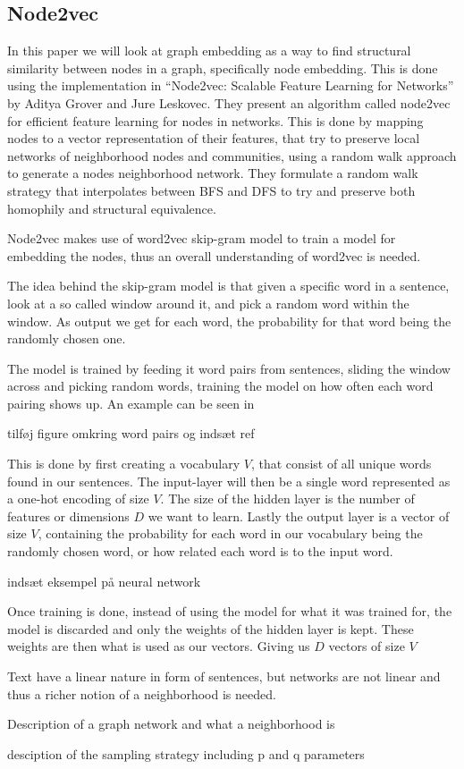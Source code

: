 \subsection{Node2vec}
In this paper we will look at graph embedding as a way to find structural similarity between nodes in a graph, specifically node embedding. This is done using the implementation in “Node2vec: Scalable Feature Learning for Networks” by Aditya Grover and Jure Leskovec. They present an algorithm called node2vec for efficient feature learning for nodes in networks. This is done by mapping nodes to a vector representation of their features, that try to preserve local networks of neighborhood nodes and communities, using a random walk approach to generate a nodes neighborhood network. They formulate a random walk strategy that interpolates between BFS and DFS to try and preserve both homophily and structural equivalence.

Node2vec makes use of word2vec skip-gram model to train a model for embedding the nodes, thus an overall understanding of word2vec is needed.

The idea behind the skip-gram model is that given a specific word in a sentence, look at a so called window around it, and pick a random word within the window. As output we get for each word, the probability for that word being the randomly chosen one.

The model is trained by feeding it word pairs from sentences, sliding the window across and picking random words, training the model on how often each word pairing shows up. An example can be seen in 

\TODO tilføj figure omkring word pairs og indsæt ref

This is done by first creating a vocabulary $V$, that consist of all unique words found in our sentences. The input-layer will then be a single word represented as a one-hot encoding of size $V$. The size of the hidden layer is the number of features or dimensions $D$ we want to learn. Lastly the output layer is a vector of size $V$, containing the probability for each word in our vocabulary being the randomly chosen word, or how related each word is to the input word.

\TODO indsæt eksempel på neural network

Once training is done, instead of using the model for what it was trained for, the model is discarded and only the weights of the hidden layer is kept. These weights are then what is used as our vectors. Giving us $D$ vectors of size $V$ 

Text have a linear nature in form of sentences, but networks are not linear and thus a richer notion of a neighborhood is needed.

\TODO Description of a graph network and what a neighborhood is

\TODO desciption of the sampling strategy including p and q parameters